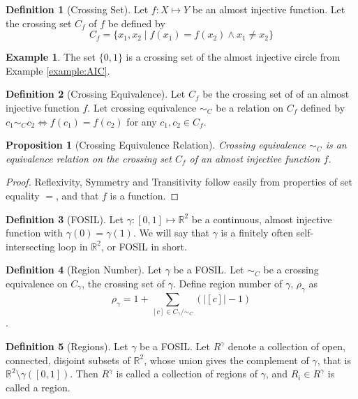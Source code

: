 \documentclass{article}
\theoremstyle{definition}
\newtheorem{definition}{Definition}
\theoremstyle{definition}
\newtheorem{example}{Example}
\theoremstyle{plain}
\newtheorem{proposition}{Proposition}
\begin{document}
\begin{definition}[Crossing Set]
Let $f: X \mapsto Y$ be an almost injective function. Let the crossing set $C_{f}$ of $f$ be defined by $$C_{f} = \{x_{1}, x_{2} \mid f(x_{1}) = f(x_{2}) \land x_{1} \neq x_{2}\}$$
\end{definition}

\begin{example}
The set $\{0, 1\}$ is a crossing set of the almost injective circle from Example \ref{example:AIC}.
\end{example}

\begin{definition}[Crossing Equivalence]
Let $C_{f}$ be the crossing set of of an almost injective function $f$. Let crossing equivalence $\sim_{C}$ be a relation on $C_{f}$ defined by $c_{1} \sim_{C} c_{2} \iff f(c_{1})=f(c_{2})$ for any $c_{1}, c_{2} \in C_{f}$.
\end{definition}

\begin{proposition}[Crossing Equivalence Relation]
Crossing equivalence $\sim_{C}$ is an equivalence relation on the crossing set $C_{f}$ of an almost injective function $f$.
\end{proposition}

\begin{proof}
Reflexivity, Symmetry and Transitivity follow easily from properties of set equality $=$, and that $f$ is a function.
\end{proof}

\begin{definition}[FOSIL]
Let $\gamma : [0, 1] \mapsto \mathbb{R}^{2}$ be a continuous, almost injective function with $\gamma(0) = \gamma(1)$. We will say that $\gamma$ is a finitely often self-intersecting loop in $\mathbb{R}^{2}$, or FOSIL in short.
\end{definition}

\begin{definition}[Region Number]
Let $\gamma$ be a FOSIL. Let $\sim_{C}$ be a crossing equivalence on $C_{\gamma}$, the crossing set of $\gamma$. Define region number of $\gamma$, $\rho_{\gamma}$ as $$\rho_{\gamma} = 1 + \sum_{[c]\in C_{\gamma}/\sim_{C}}{(\lvert[c]\rvert - 1)}$$.
\end{definition}

\begin{definition}[Regions]
Let $\gamma$ be a FOSIL. Let $R^{\gamma}$ denote a collection of open, connected, disjoint subsets of $\mathbb{R}^{2}$, whose union gives the complement of $\gamma$, that is $\mathbb{R}^{2}\setminus\gamma([0,1])$. Then $R^{\gamma}$ is called a collection of regions of $\gamma$, and $R_{i} \in R^{\gamma}$ is called a region.
\end{definition}
\end{document}
